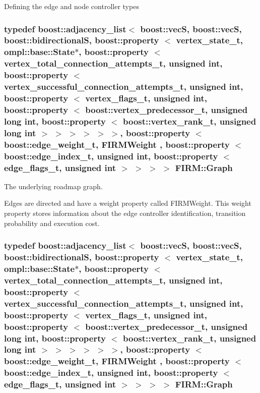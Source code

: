 \-Defining the edge and node controller types \hypertarget{class_f_i_r_m_a687e9f4243b22c30ee1fa5da22a85053}{
\subsubsection[{\-Graph}]{\setlength{\rightskip}{0pt plus 5cm}typedef boost\-::adjacency\-\_\-list$<$ boost\-::vec\-S, boost\-::vec\-S, boost\-::bidirectional\-S, boost\-::property $<$ {\bf vertex\-\_\-state\-\_\-t}, ompl\-::base\-::\-State$\ast$, boost\-::property $<$ {\bf vertex\-\_\-total\-\_\-connection\-\_\-attempts\-\_\-t}, unsigned int, boost\-::property $<$ {\bf vertex\-\_\-successful\-\_\-connection\-\_\-attempts\-\_\-t}, unsigned int, boost\-::property $<$ {\bf vertex\-\_\-flags\-\_\-t}, unsigned int, boost\-::property $<$ boost\-::vertex\-\_\-predecessor\-\_\-t, unsigned long int, boost\-::property $<$ boost\-::vertex\-\_\-rank\-\_\-t, unsigned long int $>$ $>$ $>$ $>$ $>$ $>$, boost\-::property $<$ boost\-::edge\-\_\-weight\-\_\-t, {\bf \-F\-I\-R\-M\-Weight} , boost\-::property $<$ boost\-::edge\-\_\-index\-\_\-t, unsigned int, boost\-::property $<$ {\bf edge\-\_\-flags\-\_\-t}, unsigned int $>$ $>$ $>$ $>$ {\bf \-F\-I\-R\-M\-::\-Graph}}}\label{class_f_i_r_m_a687e9f4243b22c30ee1fa5da22a85053}


\-The underlying roadmap graph. 

\begin{DoxyParagraph}{\-Edges are directed and have a weight property called \-F\-I\-R\-M\-Weight. \-This weight property}
stores information about the edge controller identification, transition probability and execution cost. 
\end{DoxyParagraph}
\hypertarget{class_f_i_r_m_a687e9f4243b22c30ee1fa5da22a85053}{
\subsubsection[{\-Graph}]{\setlength{\rightskip}{0pt plus 5cm}typedef boost\-::adjacency\-\_\-list$<$ boost\-::vec\-S, boost\-::vec\-S, boost\-::bidirectional\-S, boost\-::property $<$ {\bf vertex\-\_\-state\-\_\-t}, ompl\-::base\-::\-State$\ast$, boost\-::property $<$ {\bf vertex\-\_\-total\-\_\-connection\-\_\-attempts\-\_\-t}, unsigned int, boost\-::property $<$ {\bf vertex\-\_\-successful\-\_\-connection\-\_\-attempts\-\_\-t}, unsigned int, boost\-::property $<$ {\bf vertex\-\_\-flags\-\_\-t}, unsigned int, boost\-::property $<$ boost\-::vertex\-\_\-predecessor\-\_\-t, unsigned long int, boost\-::property $<$ boost\-::vertex\-\_\-rank\-\_\-t, unsigned long int $>$ $>$ $>$ $>$ $>$ $>$, boost\-::property $<$ boost\-::edge\-\_\-weight\-\_\-t, {\bf \-F\-I\-R\-M\-Weight} , boost\-::property $<$ boost\-::edge\-\_\-index\-\_\-t, unsigned int, boost\-::property $<$ {\bf edge\-\_\-flags\-\_\-t}, unsigned int $>$ $>$ $>$ $>$ {\bf \-F\-I\-R\-M\-::\-Graph}}}\label{class_f_i_r_m_a687e9f4243b22c30ee1fa5da22a85053}


